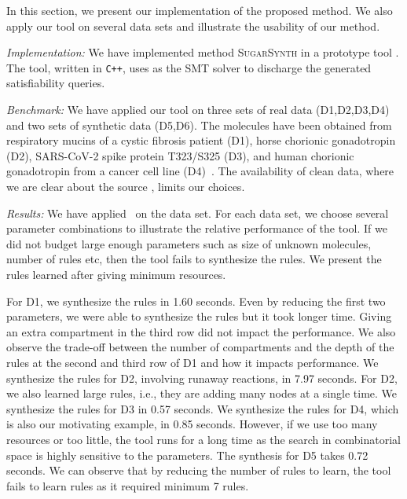 In this section, we  present our implementation of the proposed method.
%
We also apply our tool on several data sets and illustrate the usability of our method.

{\em Implementation:} 
We have implemented method \textsc{SugarSynth} in a prototype tool {\ourtool}.
%
The tool, written in {\tt C++}, uses {\zthree}\cite{z3} as the SMT solver
to discharge the generated satisfiability queries.
%


{\em Benchmark: }
We have applied our tool on three sets of real data (D1,D2,D3,D4) and two sets of synthetic data (D5,D6). The molecules have been obtained from
respiratory mucins of a cystic fibrosis patient (D1),
horse chorionic gonadotropin (D2), SARS-CoV-2 spike protein T323/S325 (D3), and human chorionic gonadotropin from a cancer cell line (D4)~\cite{Jaiman2018,10.1093/glycob/cwaa042}.
The availability of clean data, where we are clear about the source
, limits our choices.

% 



{\em Results:}
We have applied \ourtool~on the data set. For each data set, we choose several
parameter combinations to illustrate the relative performance of the tool.
If we did not budget large enough parameters such as size of unknown molecules, number of rules etc, then the tool fails to
synthesize the rules.
We present the rules learned after giving minimum resources.

For D1, we synthesize the rules in 1.60 seconds. Even by reducing the first two parameters, we were able to synthesize the rules but it took longer time.
Giving an extra compartment in the third row did not impact the performance.  We also observe the trade-off between the number of compartments
and the depth of the rules at the second and third row of D1 and how it impacts performance.
We synthesize the rules for D2, involving runaway reactions,  in 7.97 seconds.
For D2, we also learned large rules, i.e., they are adding many nodes at a single time.
We synthesize the rules for D3 in 0.57 seconds. We synthesize the rules for D4, which is also our motivating example, in 0.85 seconds.
However, if we use too many resources or too little, the tool runs for a long time as the search in combinatorial space is highly sensitive to the parameters.
The synthesis for D5 takes 0.72 seconds. We can observe that by reducing the number of rules to learn, the tool fails to learn rules as it required minimum 7 rules.

